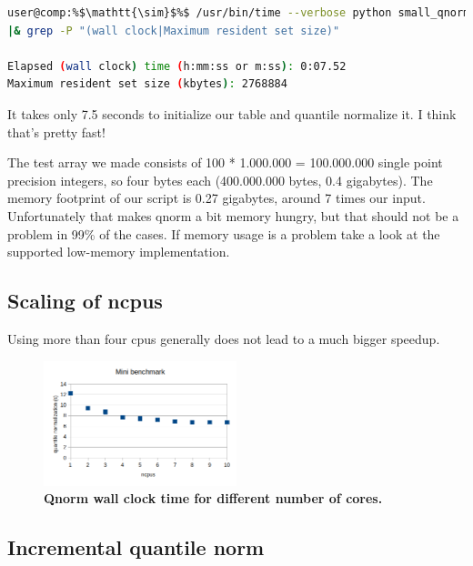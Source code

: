 \begin{mdframed}[
    backgroundcolor=bash_backcolor,
    hidealllines=true,
    innertopmargin=0pt,
    innerbottommargin=0pt,
    innerleftmargin=0pt,
    innerrightmargin=0pt
]
\begin{lstlisting}[escapechar=\%,language=bash,basicstyle=\ttfamily\color{white}]
user@comp:%$\mathtt{\sim}$%$ /usr/bin/time --verbose python small_qnorm_script.py \
|& grep -P "(wall clock|Maximum resident set size)"

Elapsed (wall clock) time (h:mm:ss or m:ss): 0:07.52
Maximum resident set size (kbytes): 2768884
\end{lstlisting}
\end{mdframed}

It takes only 7.5 seconds to initialize our table and quantile normalize it. I think that's pretty fast!

The test array we made consists of 100 * 1.000.000 = 100.000.000 single point precision integers, so four bytes each (400.000.000 bytes, 0.4 gigabytes). The memory footprint of our script is 0.27 gigabytes, around 7 times our input. Unfortunately that makes qnorm a bit memory hungry, but that should not be a problem in 99\% of the cases. If memory usage is a problem take a look at the supported low-memory implementation.

\subsection{Scaling of ncpus}

Using more than four cpus generally does not lead to a much bigger speedup.

\begin{figure}[H]
	\centering
	\includegraphics[width=0.5\textwidth]{ch.qnorm/imgs/benchmark_cores.png}
	\caption{\label{fig:benchmark_cores}\textbf{Qnorm wall clock time for different number of cores.}}
\end{figure}

\subsection{Incremental quantile norm}

